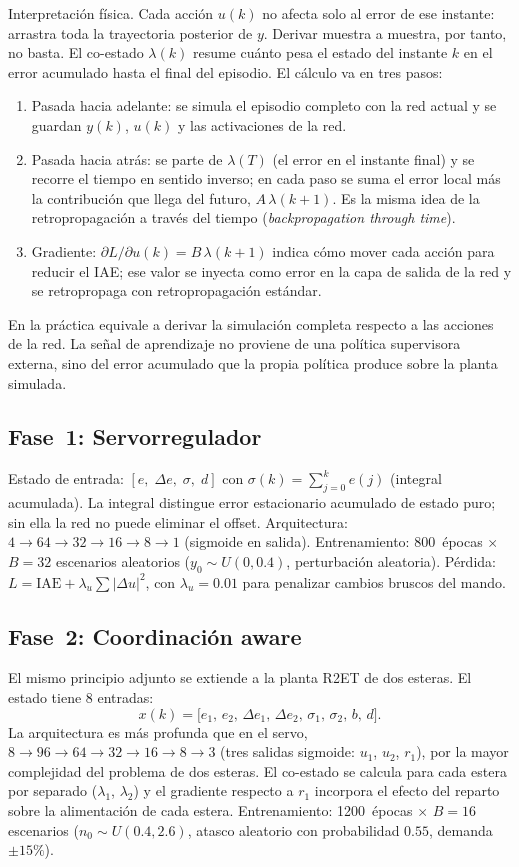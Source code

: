 Interpretación física. Cada acción $u(k)$ no afecta solo al error de ese instante: arrastra toda la trayectoria posterior de $y$. Derivar muestra a muestra, por tanto, no basta. El co-estado $\lambda(k)$ resume cuánto pesa el estado del instante $k$ en el error acumulado hasta el final del episodio. El cálculo va en tres pasos:
\begin{enumerate}
  \item Pasada hacia adelante: se simula el episodio completo con la red actual y se guardan $y(k)$, $u(k)$ y las activaciones de la red.
  \item Pasada hacia atrás: se parte de $\lambda(T)$ (el error en el instante final) y se recorre el tiempo en sentido inverso; en cada paso se suma el error local más la contribución que llega del futuro, $A\,\lambda(k+1)$. Es la misma idea de la retropropagación a través del tiempo (\emph{backpropagation through time}).
  \item Gradiente: $\partial L/\partial u(k)=B\,\lambda(k+1)$ indica cómo mover cada acción para reducir el IAE; ese valor se inyecta como error en la capa de salida de la red y se retropropaga con retropropagación estándar.
\end{enumerate}
En la práctica equivale a derivar la simulación completa respecto a las acciones de la red. La señal de aprendizaje no proviene de una política supervisora externa, sino del error acumulado que la propia política produce sobre la planta simulada.

\subsection*{Fase~1: Servorregulador}

Estado de entrada: $[e,\;\Delta e,\;\sigma,\;d]$ con $\sigma(k)=\sum_{j=0}^{k}e(j)$ (integral acumulada). La integral distingue error estacionario acumulado de estado puro; sin ella la red no puede eliminar el offset. Arquitectura: $4\!\to\!64\!\to\!32\!\to\!16\!\to\!8\!\to\!1$ (sigmoide en salida). Entrenamiento: 800~épocas $\times$ $B=32$ escenarios aleatorios ($y_0\sim U(0,0.4)$, perturbación aleatoria). Pérdida: $L=\text{IAE}+\lambda_u\sum|\Delta u|^2$, con $\lambda_u=0.01$ para penalizar cambios bruscos del mando.

\subsection*{Fase~2: Coordinación aware}

El mismo principio adjunto se extiende a la planta R2ET de dos esteras. El estado tiene 8 entradas:
\[
x(k)=\big[e_1,\,e_2,\,\Delta e_1,\,\Delta e_2,\,\sigma_1,\,\sigma_2,\,b,\,d\big].
\]
La arquitectura es más profunda que en el servo, $8\!\to\!96\!\to\!64\!\to\!32\!\to\!16\!\to\!8\!\to\!3$ (tres salidas sigmoide: $u_1$, $u_2$, $r_1$), por la mayor complejidad del problema de dos esteras. El co-estado se calcula para cada estera por separado ($\lambda_1$, $\lambda_2$) y el gradiente respecto a $r_1$ incorpora el efecto del reparto sobre la alimentación de cada estera. Entrenamiento: 1200~épocas $\times$ $B=16$ escenarios ($n_0\sim U(0.4,2.6)$, atasco aleatorio con probabilidad $0.55$, demanda $\pm15\%$).

